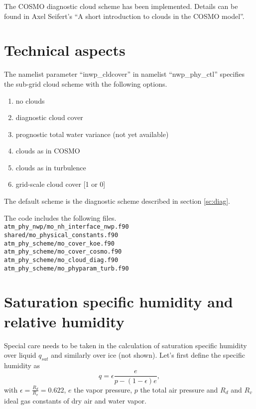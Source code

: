 \documentclass[a4paper,11pt]{article}
\begin{document}
The COSMO diagnostic cloud scheme has been implemented.  Details can be found in 
Axel Seifert's ``A short introduction to clouds in the COSMO model''.

\section{Technical aspects}

The namelist parameter ``inwp\_cldcover''
in namelist ``nwp\_phy\_ctl'' specifies the sub-grid cloud scheme with the following options.
\begin{enumerate}[start=0]
\item no clouds
\item diagnostic cloud cover
\item prognostic total water variance (not yet available)
\item clouds as in COSMO
\item clouds as in turbulence
\item grid-scale cloud cover [1 or 0]
\end{enumerate}
The default scheme is the diagnostic scheme described in section \ref{sc:diag}.

The code includes the following files.\\
\verb|atm_phy_nwp/mo_nh_interface_nwp.f90 |\\
\verb|shared/mo_physical_constants.f90    |\\
\verb|atm_phy_scheme/mo_cover_koe.f90     |\\
\verb|atm_phy_scheme/mo_cover_cosmo.f90   |\\
\verb|atm_phy_scheme/mo_cloud_diag.f90    |\\
\verb|atm_phy_scheme/mo_phyparam_turb.f90 |\\



\section{Saturation specific humidity and relative humidity}

Special care needs to be taken in the calculation of saturation specific humidity 
over liquid $q_{sat}$ and similarly over ice (not shown).  Let's first define the specific humidity as
\begin{equation}
q = \epsilon \frac{e}{p-(1-\epsilon)e} ,
\end{equation}
with $\epsilon=\frac{R_d}{R_v}=0.622$, $e$ the vapor pressure, $p$ the total air pressure and 
$R_d$ and $R_v$ ideal gas constants of dry air and water vapor.
\end{document}
